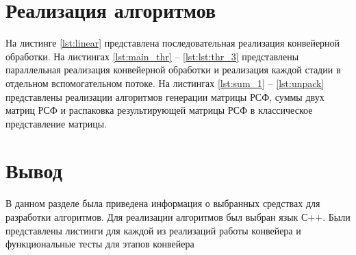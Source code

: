 \section{Реализация алгоритмов}

На листинге \ref{lst:linear} представлена последовательная реализация конвейерной обработки.
На листингах \ref{lst:main_thr} -- \ref{lst:lst:thr_3} представлены параллельная реализация конвейерной обработки и реализация каждой стадии в отдельном вспомогательном потоке.
На листингах \ref{lst:sum_1} -- \ref{lst:unpack} представлены реализации алгоритмов генерации матрицы РСФ, суммы двух матриц РСФ и распаковка результирующей матрицы РСФ в классическое представление матрицы.



\clearpage


\clearpage





\clearpage







\clearpage



\clearpage



\section*{Вывод}

В данном разделе была приведена информация о выбранных средствах
для разработки алгоритмов. Для реализации алгоритмов был выбран язык С++. Были представлены листинги для каждой из реализаций работы конвейера и функциональные тесты для этапов конвейера